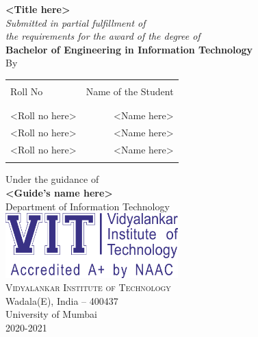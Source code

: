 \begin{titlepage}
       \begin{center}
              \Large \textbf {<Title here>}\\[0.5cm]
              \small \emph{Submitted in partial fulfillment of\\
                     the requirements for the award of the degree of}\\[0.2cm]
              {\bf Bachelor of Engineering in Information Technology}\\[0.5cm]

              By \\
              \begin{table}[h]
                     \centering
                     \begin{tabular}{lr}\hline                           \\
                            Roll No        & Name of the Student \\
                            \\ \hline
                            \\
                            <Roll no here> & <Name here>         \\
                            <Roll no here> & <Name here>         \\
                            <Roll no here> & <Name here>         \\
                            \\ \hline
                     \end{tabular}
              \end{table}

              \vspace{0.5cm}

              Under the guidance of\\[0.2cm]
              {\textbf{<Guide's name here>}}\\[0.5cm]

              \Large{Department of Information Technology}\\[0.5cm]
              \includegraphics[width=0.50\textwidth]{./vit-logo.png}\\[0.5cm]
              \normalsize \textsc{Vidyalankar Institute of Technology}\\
              Wadala(E), India -- 400437\\[0.5cm]
              \large{University of Mumbai\\
                     2020-2021}
       \end{center}
\end{titlepage}
